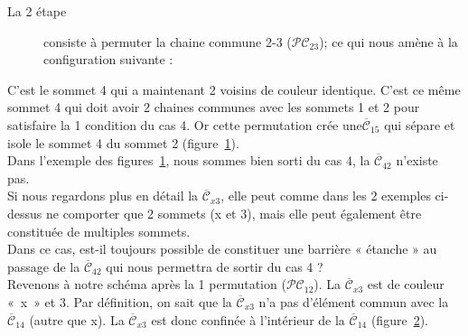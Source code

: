 \begin{description}
\item[La 2 étape] consiste à permuter la chaine commune 2-3  ($\mathcal{PC}_{23}$); ce qui nous amène à la configuration suivante :\	
\end{description}

\begin{figure}[!ht]\centering
	\begin{changemargin}{0cm}{-3cm}
		\begin{center}
			
			\hspace{15pt}
			
		\end{center}
	\end{changemargin}
	\begin{changemargin}{3cm}{0cm}
	\caption{}\label{fig:cas4_etape2_1}
	\end{changemargin}
\end{figure}	
\FloatBarrier


C’est le sommet 4 qui a maintenant 2 voisins de couleur identique. C’est ce même sommet 4 qui doit avoir 2 chaines communes avec les sommets 1 et 2 pour satisfaire la 1  condition du cas 4.
Or cette permutation crée une$\overline{\mathcal{C}}_{15}$ qui sépare et isole le sommet 4 du sommet 2  (figure~\ref{fig:cas4_etape2_1}).\\
Dans l'exemple des figures~\ref{fig:cas4_etape2_1}, nous sommes bien sorti du cas 4, la $\overline{\mathcal{C}}_{42}$ n'existe pas.\\
Si nous regardons plus en détail la $\overline{\mathcal{C}}_{x3}$, elle peut comme dans les 2 exemples ci-dessus ne comporter que 2 sommets (x et 3), mais elle peut également être constituée de multiples sommets.\\
Dans ce cas, est-il toujours possible de constituer une barrière « étanche » au passage de la $\overline{\mathcal{C}}_{42}$ qui nous permettra de sortir du cas 4 ?\\
Revenons à notre schéma après la 1\up{ere} permutation ($\mathcal{PC}_{12}$).
La $\overline{\mathcal{C}}_{x3}$ est de couleur «~x~» et 3. Par définition, on sait que la $\overline{\mathcal{C}}_{x3}$ n'a pas d’élément commun avec la $\overline{\mathcal{C}}_{14}$ (autre que x). La $\overline{\mathcal{C}}_{x3}$ est donc confinée à l’intérieur de la $\overline{\mathcal{C}}_{14}$ (figure~\ref{fig:cas4_etape2_barrage}).
\begin{figure}[!ht]\centering
	\begin{changemargin}{0cm}{-3cm}
		\begin{center}
			
		\end{center}
	\end{changemargin}
	\begin{changemargin}{3cm}{0cm}
	\caption{}\label{fig:cas4_etape2_barrage}
	\end{changemargin}
\end{figure}	
\FloatBarrier


